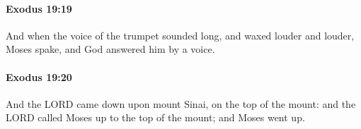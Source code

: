 		\paragraph{Exodus 19:19} %
			\label{EXODUS-19-19}

			And when the voice of the trumpet sounded long, and waxed louder and louder, Moses spake, and God answered him by a voice.


		\paragraph{Exodus 19:20} %
			\label{EXODUS-19-20}

			And the LORD came down upon mount Sinai, on the top of the mount: and the LORD called Moses up to the top of the mount; and Moses went up.


